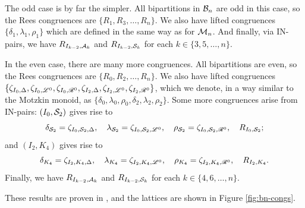 The odd case is by far the simpler.  All bipartitions in $\mathcal{B}_n$ are odd in
this case, so the Rees congruences are $\{R_1, R_3, \ldots, R_n\}$.  We also
have lifted congruences $\{\delta_1, \lambda_1, \rho_1\}$ which are defined in
the same way as for $\mathcal{M}_n$.  And finally, via IN-pairs, we have
$R_{I_{k-2}, \mathcal{A}_k}$ and $R_{I_{k-2}, \mathcal{S}_k}$ for each
$k \in \{3, 5, \ldots, n\}$.

In the even case, there are many more congruences.  All bipartitions are even,
so the Rees congruences are $\{R_0, R_2, \ldots, R_n\}$.  We also have lifted
congruences
$\{\zeta_{I_0,\Delta}, \zeta_{I_0,\mathrel{\mathscr{L}}^0}, \zeta_{I_0,\mathrel{\mathscr{R}}^0},
\zeta_{I_2,\Delta}, \zeta_{I_2,\mathrel{\mathscr{L}}^0}, \zeta_{I_2,\mathrel{\mathscr{R}}^0}\}$, which we
denote, in a way similar to the Motzkin monoid, as
$\{\delta_0, \lambda_0, \rho_0, \delta_2, \lambda_2, \rho_2\}$.
Some more congruences arise from IN-pairs: $(I_0, \mathcal{S}_2)$ gives rise
to $$\delta_{\mathcal{S}_2} = \zeta_{I_0,\mathcal{S}_2,\Delta},\quad
\lambda_{\mathcal{S}_2} = \zeta_{I_0,\mathcal{S}_2,\mathrel{\mathscr{L}}^0},\quad
\rho_{\mathcal{S}_2} = \zeta_{I_0,\mathcal{S}_2,\mathrel{\mathscr{R}}^0},\quad
R_{I_0,\mathcal{S}_2};$$
and $(I_2, K_4)$ gives rise to
$$\delta_{K_4} = \zeta_{I_2,K_4,\Delta},\quad
\lambda_{K_4} = \zeta_{I_2,K_4,\mathrel{\mathscr{L}}^0},\quad
\rho_{K_4} = \zeta_{I_2,K_4,\mathrel{\mathscr{R}}^0},\quad
R_{I_2,K_4}.$$
Finally, we have $R_{I_{k-2},\mathcal{A}_k}$ and $R_{I_{k-2},\mathcal{S}_k}$ for each $k \in
\{4, 6, \ldots, n\}$.

These results are proven in \cite[\S8]{ourpaper}, and the lattices are shown in
Figure \ref{fig:bn-congs}.

